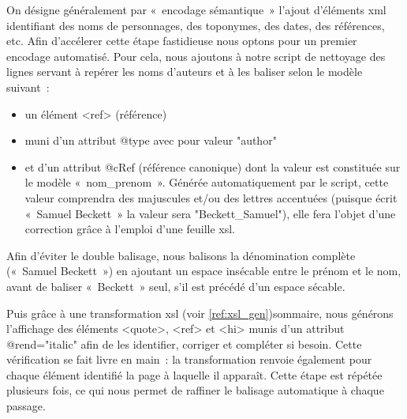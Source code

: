 \documentclass[12pt, a4paper]{article}
\begin{document}
On désigne généralement par «~encodage sémantique~» l'ajout d'éléments xml identifiant des noms de personnages, des toponymes, des dates, des références, etc. Afin d'accélerer cette étape fastidieuse nous optons pour un premier encodage automatisé. Pour cela, nous ajoutons à notre script de nettoyage des lignes servant à repérer les noms d'auteurs et à les baliser selon le modèle suivant~:
\begin{itemize}
    \item un élément <ref> (référence)
    \item muni d'un attribut @type avec pour valeur "author"
    \item et d'un attribut @cRef (référence canonique) dont la valeur est constituée sur le modèle «~nom\_prenom~». Générée automatiquement par le script, cette valeur comprendra des majuscules et/ou des lettres accentuées (puisque \robbe{} écrit «~Samuel Beckett~» la valeur sera "Beckett\_Samuel"), elle fera l'objet d'une correction grâce à l'emploi d'une feuille xsl.
\end{itemize}
Afin d'éviter le double balisage, nous balisons la dénomination complète («~Samuel Beckett~») en ajoutant un espace insécable entre le prénom et le nom, avant de baliser «~Beckett~» seul, s'il est précédé d'un espace sécable.


Puis grâce à une transformation xsl (voir \ref{ref:xsl_gen})sommaire, nous générons l'affichage des éléments <quote>, <ref> et <hi> munis d'un attribut @rend="italic" afin de les identifier, corriger et compléter si besoin. Cette vérification se fait livre en main~: la transformation renvoie également pour chaque élément identifié la page à laquelle il apparaît. Cette étape est répétée plusieurs fois, ce qui nous permet de raffiner le balisage automatique à chaque passage.
\end{document}

